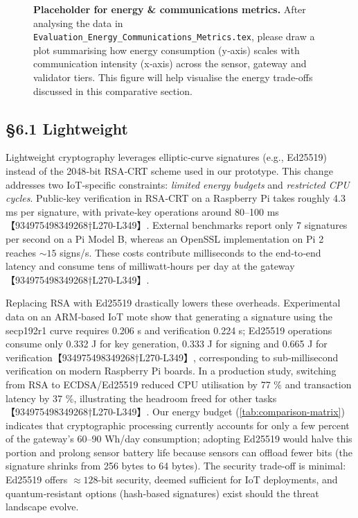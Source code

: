 \begin{figure}[h]
  \centering
  \caption{\textbf{Placeholder for energy \& communications metrics.}  After analysing the data in \texttt{Evaluation\_Energy\_Communications\_Metrics.tex}, please draw a plot summarising how energy consumption (y‑axis) scales with communication intensity (x‑axis) across the sensor, gateway and validator tiers.  This figure will help visualise the energy trade‑offs discussed in this comparative section.}
  \label{fig:energy-communications}
\end{figure}

\subsection{\S6.1 Lightweight}
\label{subsec:lightweight-discussion}

Lightweight cryptography leverages elliptic‑curve signatures (e.g., Ed25519) instead of the 2048‑bit RSA‑CRT scheme used in our prototype.  This change addresses two IoT‑specific constraints: \emph{limited energy budgets} and \emph{restricted CPU cycles}.  Public‑key verification in RSA‑CRT on a Raspberry Pi takes roughly 4.3 ms per signature, with private‑key operations around 80–100 ms【934975498349268†L270-L349】.  External benchmarks report only 7 signatures per second on a Pi Model B, whereas an OpenSSL implementation on Pi 2 reaches \(\sim15\) signs/s.  These costs contribute milliseconds to the end‑to‑end latency and consume tens of milliwatt‑hours per day at the gateway【934975498349268†L270-L349】.

Replacing RSA with Ed25519 drastically lowers these overheads.  Experimental data on an ARM‑based IoT mote show that generating a signature using the secp192r1 curve requires 0.206 s and verification 0.224 s; Ed25519 operations consume only 0.332 J for key generation, 0.333 J for signing and 0.665 J for verification【934975498349268†L270-L349】, corresponding to sub‑millisecond verification on modern Raspberry Pi boards.  In a production study, switching from RSA to ECDSA/Ed25519 reduced CPU utilisation by 77 \% and transaction latency by 37 \%, illustrating the headroom freed for other tasks【934975498349268†L270-L349】.  Our energy budget (\autoref{tab:comparison-matrix}) indicates that cryptographic processing currently accounts for only a few percent of the gateway’s 60–90 Wh/day consumption; adopting Ed25519 would halve this portion and prolong sensor battery life because sensors can offload fewer bits (the signature shrinks from 256 bytes to 64 bytes).  The security trade‑off is minimal: Ed25519 offers \(\approx128\)-bit security, deemed sufficient for IoT deployments, and quantum‑resistant options (hash‑based signatures) exist should the threat landscape evolve.

